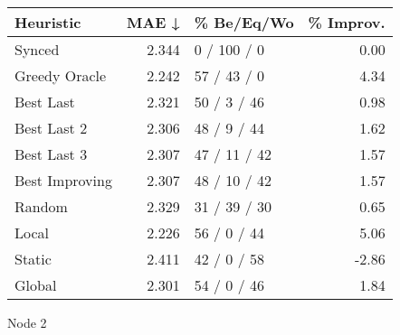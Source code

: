\begin{tabular}{lrlr}
\toprule
\textbf{Heuristic} & \textbf{MAE ↓} & \textbf{\% Be/Eq/Wo} & \textbf{\% Improv.} \\
\midrule
            Synced &          2.344 &          0 / 100 / 0 &                0.00 \\
     Greedy Oracle &          2.242 &          57 / 43 / 0 &                4.34 \\
         Best Last &          2.321 &          50 / 3 / 46 &                0.98 \\
       Best Last 2 &          2.306 &          48 / 9 / 44 &                1.62 \\
       Best Last 3 &          2.307 &         47 / 11 / 42 &                1.57 \\
    Best Improving &          2.307 &         48 / 10 / 42 &                1.57 \\
            Random &          2.329 &         31 / 39 / 30 &                0.65 \\
             Local &          2.226 &          56 / 0 / 44 &                5.06 \\
            Static &          2.411 &          42 / 0 / 58 &               -2.86 \\
            Global &          2.301 &          54 / 0 / 46 &                1.84 \\
\bottomrule
\end{tabular}
\caption{Node 2}
\label{tab:ds_non_lr05_le1_bs2_2}
